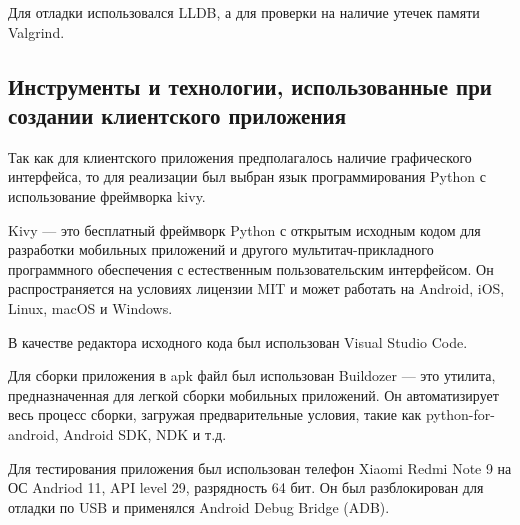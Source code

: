 Для отладки использовался LLDB, а для проверки на наличие утечек памяти Valgrind.

\subsection{Инструменты и технологии, использованные при создании клиентского приложения}

Так как для клиентского приложения предполагалось наличие графического интерфейса, то для реализации был выбран язык программирования Python с использование фреймворка kivy.

Kivy --- это бесплатный фреймворк Python с открытым исходным кодом для разработки мобильных приложений и другого мультитач-прикладного программного обеспечения с естественным пользовательским интерфейсом. Он распространяется на условиях лицензии MIT и может работать на Android, iOS, Linux, macOS и Windows.

В качестве редактора исходного кода был использован Visual Studio Code.

Для сборки приложения в apk файл был использован Buildozer --- это утилита, предназначенная для легкой сборки мобильных приложений. Он автоматизирует весь процесс сборки, загружая предварительные условия, такие как python-for-android, Android SDK, NDK и т.д.

Для тестирования приложения был использован телефон Xiaomi Redmi Note 9 на ОС Andriod 11, API level 29, разрядность 64 бит. Он был разблокирован для отладки по USB и применялся Android Debug Bridge (ADB).